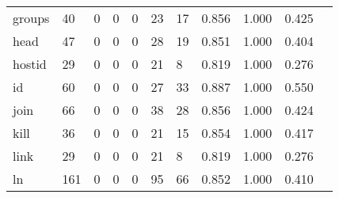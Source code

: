 \begin{longtable}{lp{1.10cm}p{1.10cm}p{1.10cm}p{1.10cm}p{1.10cm}p{1.10cm}p{1.10cm}p{1.10cm}p{1.10cm}p{1.10cm}}
groups    &                     40 &                                  0 &                                 0 &                                0 &                                23 &                              17 &                          0.856 &                                 1.000 &                               0.425 \\
head      &                     47 &                                  0 &                                 0 &                                0 &                                28 &                              19 &                          0.851 &                                 1.000 &                               0.404 \\
hostid    &                     29 &                                  0 &                                 0 &                                0 &                                21 &                               8 &                          0.819 &                                 1.000 &                               0.276 \\
id        &                     60 &                                  0 &                                 0 &                                0 &                                27 &                              33 &                          0.887 &                                 1.000 &                               0.550 \\
join      &                     66 &                                  0 &                                 0 &                                0 &                                38 &                              28 &                          0.856 &                                 1.000 &                               0.424 \\
kill      &                     36 &                                  0 &                                 0 &                                0 &                                21 &                              15 &                          0.854 &                                 1.000 &                               0.417 \\
link      &                     29 &                                  0 &                                 0 &                                0 &                                21 &                               8 &                          0.819 &                                 1.000 &                               0.276 \\
ln        &                    161 &                                  0 &                                 0 &                                0 &                                95 &                              66 &                          0.852 &                                 1.000 &                               0.410 \\

\end{longtable}
